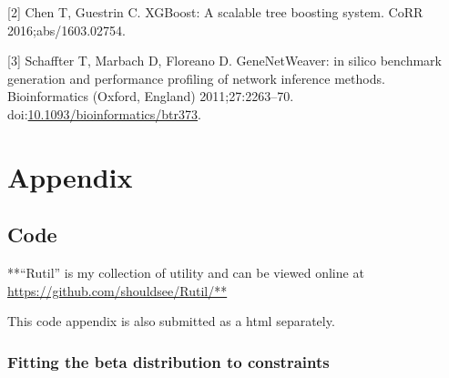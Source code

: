 \documentclass[]{article}
\theoremstyle{definition}
\theoremstyle{definition}
\theoremstyle{definition}
\theoremstyle{remark}
\begin{document}
\hypertarget{ref-xgboost}{}
{[}2{]} Chen T, Guestrin C. XGBoost: A scalable tree boosting system.
CoRR 2016;abs/1603.02754.

\hypertarget{ref-GENIE3}{}
{[}3{]} Schaffter T, Marbach D, Floreano D. GeneNetWeaver: in silico
benchmark generation and performance profiling of network inference
methods. Bioinformatics (Oxford, England) 2011;27:2263--70.
doi:\href{https://doi.org/10.1093/bioinformatics/btr373}{10.1093/bioinformatics/btr373}.

\section{Appendix}\label{appendix}

\subsection{Code}\label{code}

**``Rutil'' is my collection of utility and can be viewed online at
\url{https://github.com/shouldsee/Rutil/**}

This code appendix is also submitted as a html separately.

\subsubsection{Fitting the beta distribution to
constraints}\label{fitting-the-beta-distribution-to-constraints}
\end{document}
